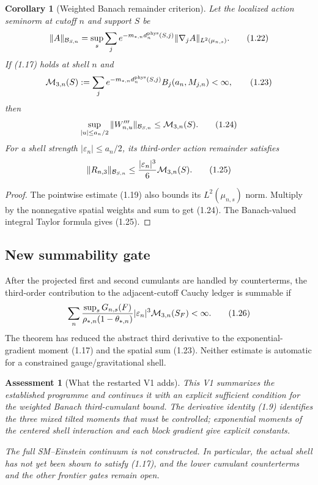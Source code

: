 \documentclass[11pt]{article}
\newtheorem{corollary}[theorem]{Corollary}
\newtheorem{assessment}[theorem]{Assessment}
\theoremstyle{remark}
\begin{document}
\begin{corollary}[Weighted Banach remainder criterion]
\label{cor:v17v1-banach}
Let the localized action seminorm at cutoff \(n\) and support \(S\)
be
\[
 \|A\|_{{\cal B}_{S,n}}
 =
 \sup_s\sum_j
 e^{-m_{*,n}d_n^{\rm phys}(S,j)}
 \|\nabla_jA\|_{L^2(\mu_{n,s})}.                   \tag{1.22}
\]
If (1.17) holds at shell \(n\) and
\[
 {\cal M}_{3,n}(S):=
 \sum_j e^{-m_{*,n}d_n^{\rm phys}(S,j)}
 B_j(a_n,M_{j,n})<\infty,                           \tag{1.23}
\]
then
\[
 \sup_{|u|\leq a_n/2}
 \|W'''_{n,u}\|_{{\cal B}_{S,n}}
 \leq{\cal M}_{3,n}(S).                             \tag{1.24}
\]
For a shell strength \(|\varepsilon_n|\leq a_n/2\), its third-order
action remainder satisfies
\[
 \|R_{n,3}\|_{{\cal B}_{S,n}}
 \leq\frac{|\varepsilon_n|^3}{6}
 {\cal M}_{3,n}(S).                                 \tag{1.25}
\]
\end{corollary}

\begin{proof}
The pointwise estimate (1.19) also bounds its \(L^2(\mu_{n,s})\)
norm.  Multiply by the nonnegative spatial weights and sum to get
(1.24).  The Banach-valued integral Taylor formula gives (1.25).
\end{proof}

\subsection{New summability gate}

After the projected first and second cumulants are handled by
counterterms, the third-order contribution to the adjacent-cutoff
Cauchy ledger is summable if
\[
 \sum_n
 \frac{\sup_sG_{n,s}(F)}
 {\rho_{*,n}(1-\theta_{*,n})}
 |\varepsilon_n|^3{\cal M}_{3,n}(S_F)
 <\infty.                                           \tag{1.26}
\]
The theorem has reduced the abstract third derivative to the
exponential-gradient moment (1.17) and the spatial sum (1.23).
Neither estimate is automatic for a constrained gauge/gravitational
shell.

\begin{assessment}[What the restarted V1 adds]
\label{ass:v17v1-status}
This V1 summarizes the established programme and continues it with
an explicit sufficient condition for the weighted Banach
third-cumulant bound.  The derivative identity (1.9) identifies the
three mixed tilted moments that must be controlled; exponential
moments of the centered shell interaction and each block gradient
give explicit constants.

The full SM--Einstein continuum is not constructed.  In particular,
the actual shell has not yet been shown to satisfy (1.17), and the
lower cumulant counterterms and the other frontier gates remain open.
\end{assessment}
\end{document}
